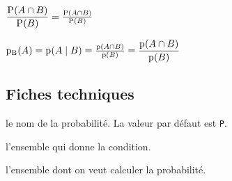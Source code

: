 \documentclass[12pt,a4paper]{article}
\begin{document}
\begin{latexex}
 $\eprobacond {B}{A}
= \eprobacond*{B}{A}$
\end{latexex}





\begin{latexex}
 $\probacond  [p]{B}{A}
= \probacond* [p]{B}{A}
= \eprobacond*[p]{B}{A}
= \eprobacond [p]{B}{A}$
\end{latexex}




\subsection{Fiches techniques}



\extraspace




\IDoption{} le nom de la probabilité. La valeur par défaut est \verb#P#.

 l'ensemble qui donne la condition.

 l'ensemble dont on veut calculer la probabilité.
\end{document}

